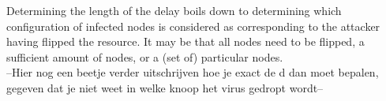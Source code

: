 Determining the length of the delay boils down to determining which configuration of infected nodes is considered as corresponding to the attacker having flipped the resource. It may be that all nodes need to be flipped, a sufficient amount of nodes, or a (set of) particular nodes.\\

--Hier nog een beetje verder uitschrijven hoe je exact de d dan moet bepalen, gegeven dat je niet weet in welke knoop het virus gedropt wordt-- \\


%
%
%
%
%
%	
%	
%
%	
%				
%				
%				
%		


%
